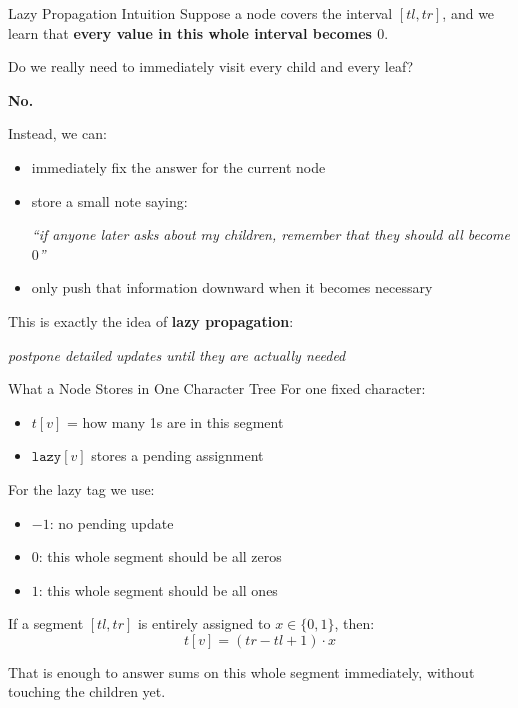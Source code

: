 \documentclass[aspectratio=169]{beamer}
\begin{document}
\begin{frame}{Lazy Propagation Intuition}
    Suppose a node covers the interval \([tl,tr]\), and we learn that
    \textbf{every value in this whole interval becomes \(0\)}.

    Do we really need to immediately visit every child and every leaf?

    \pause

    \textbf{No.}

    Instead, we can:
    \begin{itemize}
        \item immediately fix the answer for the current node
        \item store a small note saying:
        \begin{center}
            \textit{``if anyone later asks about my children,
            remember that they should all become \(0\)''}
        \end{center}
        \item only push that information downward when it becomes necessary
    \end{itemize}

    This is exactly the idea of \textbf{lazy propagation}:
    \begin{center}
        \textit{postpone detailed updates until they are actually needed}
    \end{center}
\end{frame}

\begin{frame}{What a Node Stores in One Character Tree}
    For one fixed character:
    \begin{itemize}
        \item \(t[v]\) = how many 1s are in this segment
        \item \(\texttt{lazy}[v]\) stores a pending assignment
    \end{itemize}

    For the lazy tag we use:
    \begin{itemize}
        \item \(-1\): no pending update
        \item \(0\): this whole segment should be all zeros
        \item \(1\): this whole segment should be all ones
    \end{itemize}

    If a segment \([tl,tr]\) is entirely assigned to \(x \in \{0,1\}\), then:
    \[
    t[v] = (tr - tl + 1)\cdot x
    \]

    That is enough to answer sums on this whole segment immediately,
    without touching the children yet.
\end{frame}
\end{document}
